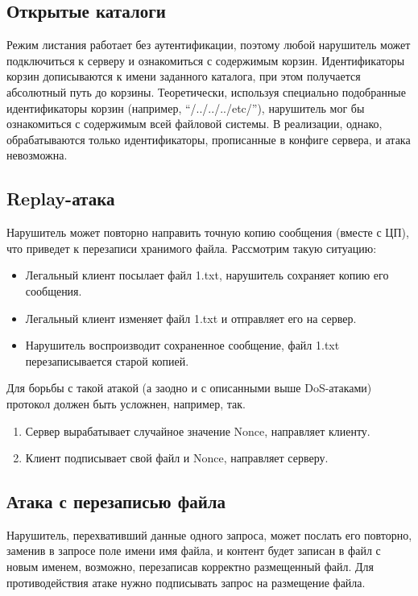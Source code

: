 \documentclass[a4paper,12pt]{article}
\begin{document}
\subsection{Открытые каталоги}

Режим листания работает без аутентификации, поэтому любой нарушитель может подключиться к серверу и ознакомиться с содержимым корзин.
Идентификаторы корзин дописываются к имени заданного каталога, при этом получается абсолютный путь до корзины. 
Теоретически, используя специально подобранные идентификаторы корзин (например, ``/../../../etc/''), нарушитель мог бы ознакомиться с содержимым всей файловой системы. В реализации, однако, обрабатываются только идентификаторы, прописанные в конфиге сервера, и атака невозможна.

\subsection{Replay-атака}

Нарушитель может повторно направить точную копию сообщения (вместе с ЦП), что приведет к перезаписи хранимого файла. Рассмотрим такую ситуацию:
\begin{itemize}
 \item Легальный клиент посылает файл 1.txt, нарушитель сохраняет копию его сообщения.
 \item Легальный клиент изменяет файл 1.txt и отправляет его на сервер.
 \item Нарушитель воспроизводит сохраненное сообщение, файл 1.txt перезаписывается старой копией.
\end{itemize}
Для борьбы с такой атакой (а заодно и с описанными выше DoS-атаками) протокол должен быть усложнен, например, так.
\begin{enumerate}
 \item Сервер вырабатывает случайное значение Nonce, направляет клиенту.
 \item Клиент подписывает свой файл и Nonce, направляет серверу.
 \end{enumerate}

\subsection{Атака с перезаписью файла} 

Нарушитель, перехвативший данные одного запроса, может послать его повторно, заменив  в запросе поле имени имя файла, и контент будет записан в файл с новым именем, возможно, перезаписав корректно размещенный файл. Для противодействия атаке нужно подписывать запрос на размещение файла.
 
\end{document}
